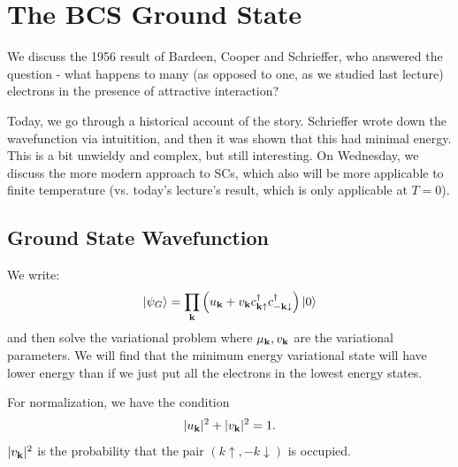 \section{The BCS Ground State}

We discuss the 1956 result of Bardeen, Cooper and Schrieffer, who answered the question - what happens to many (as opposed to one, as we studied last lecture) electrons in the presence of attractive interaction?

Today, we go through a historical account of the story. Schrieffer wrote down the wavefunction via intuitition, and then it was shown that this had minimal energy. This is a bit unwieldy and complex, but still interesting. On Wednesday, we discuss the more modern approach to SCs, which also will be more applicable to finite temperature (vs. today's lecture's result, which is only applicable at $T = 0$).

\subsection{Ground State Wavefunction}
We write:
\begin{equation}
    \lvert \psi_G \rangle = \prod_{\mathbf{k}} \left(u_{\mathbf{k}} + v_{\mathbf{k}} c^\dagger_{\mathbf{k}\uparrow}c^\dagger_{-\mathbf{k}\downarrow}\right)\lvert 0 \rangle
\end{equation}
and then solve the variational problem where $\mu_{\mathbf{k}}, v_{\mathbf{k}}$ are the variational parameters. We will find that the minimum energy variational state will have lower energy than if we just put all the electrons in the lowest energy states.

For normalization, we have the condition
\begin{equation}\label{eq-ukvknormalization}
    \lvert u_{\mathbf{k}} \rvert^2 + \lvert v_{\mathbf{k}} \rvert^2 = 1.
\end{equation}
$\lvert v_{\mathbf{k}} \rvert^2$ is the probability that the pair $(k\uparrow, -k\downarrow)$ is occupied.

